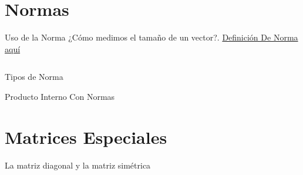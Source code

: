\section{Normas}
\label{sec:norms}

\begin{frame}{Uso de la Norma}
  ¿Cómo medimos el tamaño de un vector?. \href{https://en.wikipedia.org/wiki/Norm_(mathematics)}{Definición De Norma aquí}

  \begin{columns}[t]
  
    
  \end{columns}

\end{frame}


\begin{frame}{Tipos de Norma}
    
\end{frame}

\begin{frame}{Producto Interno Con Normas}
  
\end{frame}

\section{Matrices Especiales}
\label{sec:special-matrices}


\begin{frame}{La matriz diagonal y la matriz simétrica}

\end{frame}

